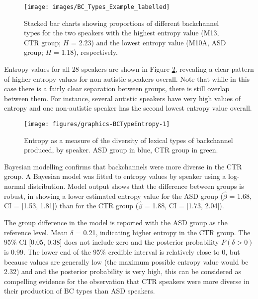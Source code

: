 \begin{figure}

\texttt{[image: images/BC\_Types\_Example\_labelled]} \hfill{}

\caption{Stacked bar charts showing proportions of different backchannel types for the two speakers with the highest entropy value (M13, CTR group; \(H\) = 2.23) and the lowest entropy value (M10A, ASD group; \(H\) = 1.18), respectively.}\label{fig:BCTypeExamplePic}
\end{figure}




Entropy values for all 28 speakers are shown in Figure \ref{fig:BCTypeEntropy}, revealing a clear pattern of higher entropy values for non-autistic speakers overall. Note that while in this case there is a fairly clear separation between groups, there is still overlap between them. For instance, several autistic speakers have very high values of entropy and one non-autistic speaker has the second lowest entropy value overall.



\begin{figure}

{\texttt{[image: figures/graphics-BCTypeEntropy-1]}
	
}

\caption{Entropy as a measure of the diversity of lexical types of backchannel produced, by speaker. ASD group in blue, CTR group in green.}\label{fig:BCTypeEntropy}
\end{figure}

Bayesian modelling confirms that backchannels were more diverse in the CTR group. A Bayesian model was fitted to entropy values by speaker using a log-normal distribution. Model output shows that the difference between groups is robust, in showing a lower estimated entropy value for the ASD group (\(\hat{\beta}\) = 1.68, CI = {[}1.53, 1.81{]}) than for the CTR group (\(\hat{\beta}\) = 1.88, CI = {[}1.73, 2.04{]}).

The group difference in the model is reported with the ASD group as the reference level. Mean \(\delta\) = 0.21, indicating higher entropy in the CTR group. The 95\% CI {[}0.05, 0.38{]} does not include zero and the posterior probability \(P(\delta > 0)\) is 0.99. The lower end of the 95\% credible interval is relatively close to 0, but because values are generally low (the maximum possible entropy value would be 2.32) and and the posterior probability is very high, this can be considered as compelling evidence for the observation that CTR speakers were more diverse in their production of BC types than ASD speakers.

